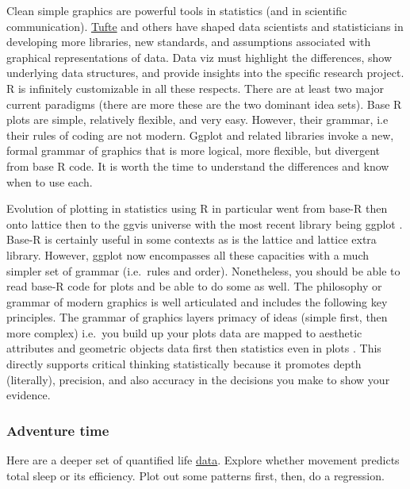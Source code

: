 \documentclass[
]{book}
\begin{document}
Clean simple graphics are powerful tools in statistics (and in scientific communication). \href{https://www.edwardtufte.com/tufte/}{Tufte} \citep{RN2096} and others have shaped data scientists and statisticians in developing more libraries, new standards, and assumptions associated with graphical representations of data. Data viz must highlight the differences, show underlying data structures, and provide insights into the specific research project. R is infinitely customizable in all these respects. There are at least two major current paradigms (there are more these are the two dominant idea sets). Base R plots are simple, relatively flexible, and very easy. However, their grammar, i.e their rules of coding are not modern. Ggplot and related libraries invoke a new, formal grammar of graphics \citep{RN7256} that is more logical, more flexible, but divergent from base R code. It is worth the time to understand the differences and know when to use each.

Evolution of plotting in statistics using R in particular went from base-R then onto lattice then to the ggvis universe with the most recent library being ggplot \citep{RN4413}. Base-R is certainly useful in some contexts as is the lattice and lattice extra library. However, ggplot now encompasses all these capacities with a much simpler set of grammar (i.e.~rules and order). Nonetheless, you should be able to read base-R code for plots and be able to do some as well. The philosophy or grammar of modern graphics is well articulated and includes the following key principles. The grammar of graphics layers primacy of ideas (simple first, then more complex) i.e.~you build up your plots data are mapped to aesthetic attributes and geometric objects data first then statistics even in plots \citep{RN7255}. This directly supports critical thinking statistically because it promotes depth (literally), precision, and also accuracy in the decisions you make to show your evidence.

\hypertarget{adventure-time-2}{%
\subsubsection*{Adventure time}\label{adventure-time-2}}

Here are a deeper set of quantified life \href{https://figshare.com/articles/dataset/Quantified_life/12803105}{data}. Explore whether movement predicts total sleep or its efficiency. Plot out some patterns first, then, do a regression.
\end{document}
